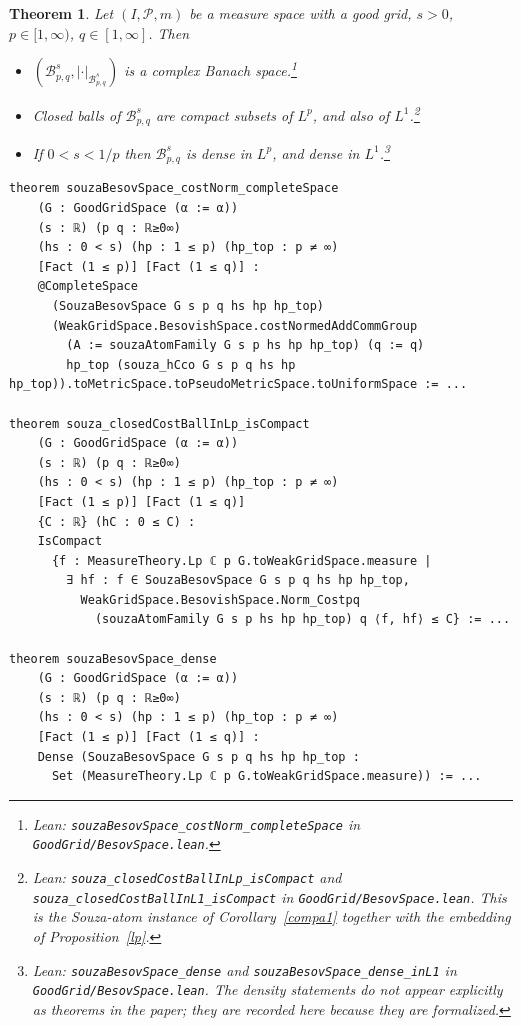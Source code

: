 \documentclass[11pt]{amsart}
\newtheorem{theorem}{Theorem}[section]
\theoremstyle{definition}
\newcommand{\lean}[1]{\texttt{#1}}
\begin{document}
\begin{theorem}\label{souzamain}
Let $(I,\mathcal{P},m)$ be a measure space with a good grid, $s>0$,
$p \in [1,\infty)$, $q \in [1,\infty]$. Then
\begin{itemize}
\item[A.] $(\mathcal{B}^s_{p,q}, |\cdot|_{\mathcal{B}^s_{p,q}})$ is a complex
Banach space.\footnote{Lean: \lean{souzaBesovSpace\_costNorm\_completeSpace}
in \lean{GoodGrid/BesovSpace.lean}.}
\item[B.] Closed balls of $\mathcal{B}^s_{p,q}$ are compact subsets of $L^p$,
and also of $L^1$.\footnote{Lean: \lean{souza\_closedCostBallInLp\_isCompact}
and \lean{souza\_closedCostBallInL1\_isCompact} in
\lean{GoodGrid/BesovSpace.lean}. This is the Souza-atom instance of
Corollary~\ref{compa1} together with the embedding of
Proposition~\ref{lp}.}
\item[C.] If $0<s<1/p$ then $\mathcal{B}^s_{p,q}$ is dense in $L^p$, and
dense in $L^1$.\footnote{Lean: \lean{souzaBesovSpace\_dense} and
\lean{souzaBesovSpace\_dense\_inL1} in \lean{GoodGrid/BesovSpace.lean}.
The density statements do not appear explicitly as theorems in the paper;
they are recorded here because they are formalized.}
\end{itemize}
\end{theorem}
\begin{lstlisting}[style=lean,basicstyle=\ttfamily\scriptsize]
theorem souzaBesovSpace_costNorm_completeSpace
    (G : GoodGridSpace (α := α))
    (s : ℝ) (p q : ℝ≥0∞)
    (hs : 0 < s) (hp : 1 ≤ p) (hp_top : p ≠ ∞)
    [Fact (1 ≤ p)] [Fact (1 ≤ q)] :
    @CompleteSpace
      (SouzaBesovSpace G s p q hs hp hp_top)
      (WeakGridSpace.BesovishSpace.costNormedAddCommGroup
        (A := souzaAtomFamily G s p hs hp hp_top) (q := q)
        hp_top (souza_hCco G s p q hs hp hp_top)).toMetricSpace.toPseudoMetricSpace.toUniformSpace := ...

theorem souza_closedCostBallInLp_isCompact
    (G : GoodGridSpace (α := α))
    (s : ℝ) (p q : ℝ≥0∞)
    (hs : 0 < s) (hp : 1 ≤ p) (hp_top : p ≠ ∞)
    [Fact (1 ≤ p)] [Fact (1 ≤ q)]
    {C : ℝ} (hC : 0 ≤ C) :
    IsCompact
      {f : MeasureTheory.Lp ℂ p G.toWeakGridSpace.measure |
        ∃ hf : f ∈ SouzaBesovSpace G s p q hs hp hp_top,
          WeakGridSpace.BesovishSpace.Norm_Costpq
            (souzaAtomFamily G s p hs hp hp_top) q ⟨f, hf⟩ ≤ C} := ...

theorem souzaBesovSpace_dense
    (G : GoodGridSpace (α := α))
    (s : ℝ) (p q : ℝ≥0∞)
    (hs : 0 < s) (hp : 1 ≤ p) (hp_top : p ≠ ∞)
    [Fact (1 ≤ p)] [Fact (1 ≤ q)] :
    Dense (SouzaBesovSpace G s p q hs hp hp_top :
      Set (MeasureTheory.Lp ℂ p G.toWeakGridSpace.measure)) := ...
\end{lstlisting}
\end{document}
